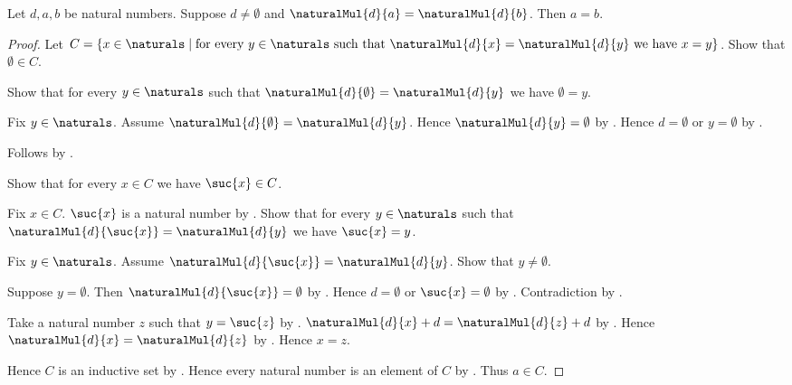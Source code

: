 \begin{theorem}\label{natural_multiplication_cancel_left}
    Let $d,a,b$ be natural numbers.
    Suppose $d\neq\emptyset$ and
        $\naturalMul{d}{a}=\naturalMul{d}{b}$.
    Then $a=b$.
\end{theorem}
\begin{proof}
    Let $C=\{x\in\naturals\mid
        \text{for every $y\in\naturals$ such that
            $\naturalMul{d}{x}=\naturalMul{d}{y}$ we have $x=y$}\}$.
    Show that $\emptyset\in C$.
    \begin{subproof}
        Show that for every $y\in\naturals$ such that
            $\naturalMul{d}{\emptyset}=\naturalMul{d}{y}$
            we have $\emptyset=y$.
        \begin{subproof}
            Fix $y\in\naturals$.
            Assume $\naturalMul{d}{\emptyset}=\naturalMul{d}{y}$.
            Hence $\naturalMul{d}{y}=\emptyset$
                by .
            Hence $d=\emptyset$ or $y=\emptyset$
                by .
        \end{subproof}
        Follows by .
    \end{subproof}
    Show that for every $x\in C$ we have $\suc{x}\in C$.
    \begin{subproof}
        Fix $x\in C$.
        $\suc{x}$ is a natural number by .
        Show that for every $y\in\naturals$ such that
            $\naturalMul{d}{\suc{x}}=\naturalMul{d}{y}$
            we have $\suc{x}=y$.
        \begin{subproof}
            Fix $y\in\naturals$.
            Assume $\naturalMul{d}{\suc{x}}=\naturalMul{d}{y}$.
            Show that $y\neq\emptyset$.
            \begin{subproof}
                Suppose $y=\emptyset$.
                Then $\naturalMul{d}{\suc{x}}=\emptyset$
                    by .
                Hence $d=\emptyset$ or $\suc{x}=\emptyset$
                    by .
                Contradiction by .
            \end{subproof}
            Take a natural number $z$ such that $y=\suc{z}$
                by .
            $\naturalMul{d}{x}+d=\naturalMul{d}{z}+d$
                by .
            Hence $\naturalMul{d}{x}=\naturalMul{d}{z}$
                by .
            Hence $x=z$.
        \end{subproof}
    \end{subproof}
    Hence $C$ is an inductive set by .
    Hence every natural number is an element of $C$
        by .
    Thus $a\in C$.
\end{proof}

